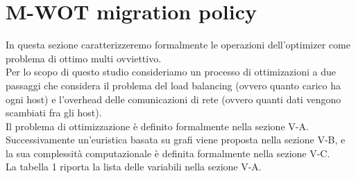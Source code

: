 \documentclass[11pt]{article}
\begin{document}
		\section{M-WOT migration policy}
		In questa sezione caratterizzeremo formalmente le operazioni dell'optimizer come problema di ottimo multi ovviettivo. \\
		Per lo scopo di questo studio consideriamo un processo di ottimizazioni a due passaggi che considera il problema del load balancing (ovvero quanto carico ha ogni host) e l'overhead delle comunicazioni di rete (ovvero quanti dati vengono scambiati fra gli host). \\
		Il problema di ottimizzazione è definito formalmente nella sezione V-A. \\ Successivamente un'euristica basata su grafi viene proposta nella sezione V-B, e la sua complessità computazionale è definita formalmente nella sezione V-C. \\
		La tabella 1 riporta la lista delle variabili nella sezione V-A.
\end{document}

